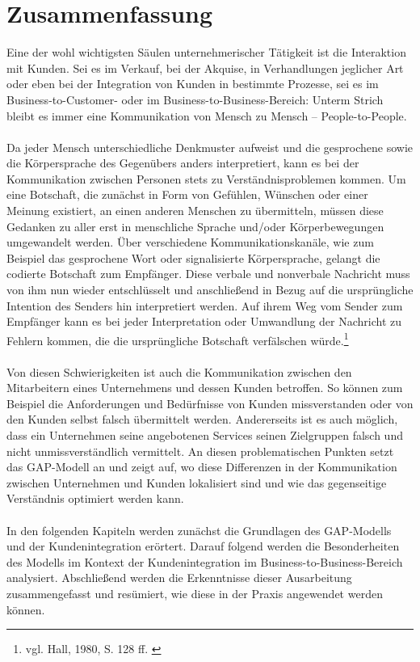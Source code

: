 \chapter{Zusammenfassung}
\label{kapitel1}
Eine der wohl wichtigsten Säulen unternehmerischer Tätigkeit ist die Interaktion mit Kunden. Sei es im Verkauf, bei der Akquise, in Verhandlungen jeglicher Art oder eben bei der Integration von Kunden in bestimmte Prozesse, sei es im Business-to-Customer- oder im Business-to-Business-Bereich: Unterm Strich bleibt es immer eine Kommunikation von Mensch zu Mensch -- People-to-People.
\\ \\
Da jeder Mensch unterschiedliche Denkmuster aufweist und die gesprochene sowie die Körpersprache des Gegenübers anders interpretiert, kann es bei der Kommunikation zwischen Personen stets zu Verständnisproblemen kommen. Um eine Botschaft, die zunächst in Form von Gefühlen, Wünschen oder einer Meinung existiert, an einen anderen Menschen zu übermitteln, müssen diese Gedanken zu aller erst in menschliche Sprache und/oder Körperbewegungen umgewandelt werden. Über verschiedene Kommunikationskanäle, wie zum Beispiel das gesprochene Wort oder signalisierte Körpersprache, gelangt die codierte Botschaft zum Empfänger. Diese verbale und nonverbale Nachricht muss von ihm nun wieder entschlüsselt und anschließend in Bezug auf die ursprüngliche Intention des Senders hin interpretiert werden. Auf ihrem Weg vom Sender zum Empfänger kann es bei jeder Interpretation oder Umwandlung der Nachricht zu Fehlern kommen, die die ursprüngliche Botschaft verfälschen würde.\footnote{vgl. Hall, 1980, S. 128 ff. \cite{Hall1980}}
\\ \\
Von diesen Schwierigkeiten ist auch die Kommunikation zwischen den Mitarbeitern eines Unternehmens und dessen Kunden betroffen. So können zum Beispiel die Anforderungen und Bedürfnisse von Kunden missverstanden oder von den Kunden selbst falsch übermittelt werden. Andererseits ist es auch möglich, dass ein Unternehmen seine angebotenen Services seinen Zielgruppen falsch und nicht unmissverständlich vermittelt. An diesen problematischen Punkten setzt das GAP-Modell an und zeigt auf, wo diese Differenzen in der Kommunikation zwischen Unternehmen und Kunden lokalisiert sind und wie das gegenseitige Verständnis optimiert werden kann.
\\ \\
In den folgenden Kapiteln werden zunächst die Grundlagen des GAP-Modells und der Kundenintegration erörtert. Darauf folgend werden die Besonderheiten des Modells im Kontext der Kundenintegration im Business-to-Business-Bereich analysiert. Abschließend werden die Erkenntnisse dieser Ausarbeitung zusammengefasst und resümiert, wie diese in der Praxis angewendet werden können.



